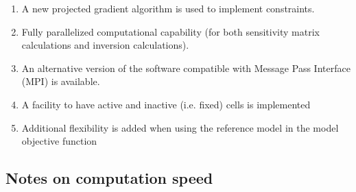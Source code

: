 \begin{enumerate}
\item A new projected gradient algorithm is used to implement constraints.
\item Fully parallelized computational capability (for both sensitivity matrix calculations and inversion calculations).
\item An alternative version of the software compatible with Message Pass Interface (MPI) is available.
\item A facility to have active and inactive (i.e. fixed) cells is implemented
\item Additional flexibility is added when using the reference model in the model objective function
\end{enumerate}

\subsection{Notes on computation speed}
